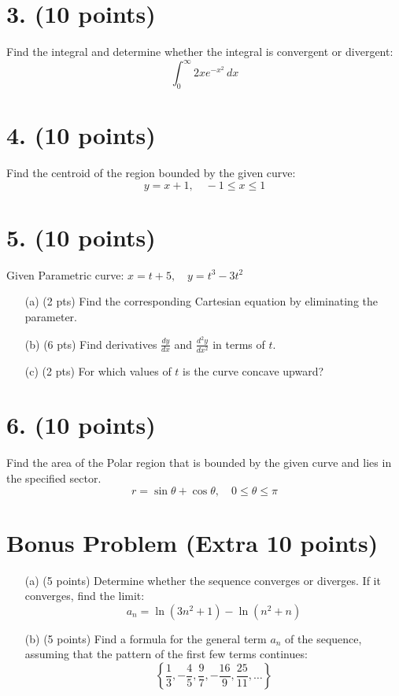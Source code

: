 \documentclass[12pt]{article}
\begin{document}
\section*{3. (10 points)}
Find the integral and determine whether the integral is convergent or divergent: \\
\[
\int_0^{\infty} 2x e^{-x^2} \, dx
\]

\section*{4. (10 points)}
Find the centroid of the region bounded by the given curve: \\
\[
y = x + 1, \quad -1 \leq x \leq 1
\]

\section*{5. (10 points)}
Given Parametric curve: \( x = t + 5, \quad y = t^3 - 3t^2 \)
\begin{enumerate}
    \item[(a)] (2 pts) Find the corresponding Cartesian equation by eliminating the parameter.
    \item[(b)] (6 pts) Find derivatives \( \frac{dy}{dx} \) and \( \frac{d^2y}{dx^2} \) in terms of \( t \). \\
    [Hint: \( \frac{dy}{dx} = \frac{dy/dt}{dx/dt} \), and \( \frac{d^2y}{dx^2} = \frac{d(dy/dx)/dt}{dx/dt} \)]
    \item[(c)] (2 pts) For which values of \( t \) is the curve concave upward?
\end{enumerate}

\section*{6. (10 points)}
Find the area of the Polar region that is bounded by the given curve and lies in the specified sector. \\
[Hint: \( \sin 2\theta = 2\sin \theta \cos \theta \)]
\[
r = \sin \theta + \cos \theta, \quad 0 \leq \theta \leq \pi
\]

\section*{Bonus Problem (Extra 10 points)}
\begin{enumerate}
    \item[(a)] (5 points) Determine whether the sequence converges or diverges. If it converges, find the limit: \\
    \[
    a_n = \ln(3n^2 + 1) - \ln(n^2 + n)
    \]
    \item[(b)] (5 points) Find a formula for the general term \( a_n \) of the sequence, assuming that the pattern of the first few terms continues: \\
    \[
    \left\{ \frac{1}{3}, -\frac{4}{5}, \frac{9}{7}, -\frac{16}{9}, \frac{25}{11}, \dots \right\}
    \]
\end{enumerate}
\end{document}
